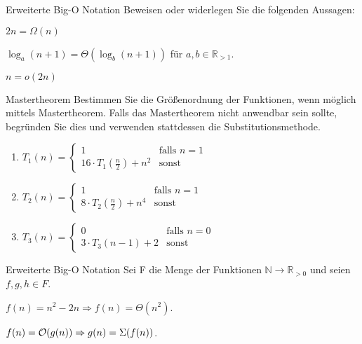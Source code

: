 \documentclass{exercisesheet}
\begin{document}
\begin{eexercises}{Erweiterte Big-O Notation}{
    Beweisen oder widerlegen Sie die folgenden Aussagen:
  }
  \item $2n = \Omega(n)$
  \item $\log_a(n+1) = \Theta(\log_b(n+1))$ für $a,b \in \mathbb{R}_{>1}$.
  \item $n = o(2n)$
\end{eexercises}

\begin{exercise}{Mastertheorem}
  Bestimmen Sie die Größenordnung der Funktionen, wenn möglich mittels Mastertheorem. Falls das Mastertheorem nicht anwendbar sein sollte, begründen Sie dies und verwenden stattdessen die Substitutionsmethode.
  \begin{enumerate}
    \item $T_1(n) = \begin{cases}
              1                               & \text{falls } n = 1 \\
              16 \cdot T_1(\frac{n}{2}) + n^2 & \text{sonst}
            \end{cases}$
    \item $T_2(n) = \begin{cases}
              1                              & \text{falls } n = 1 \\
              8 \cdot T_2(\frac{n}{2}) + n^4 & \text{sonst}
            \end{cases}$
    \item $T_3(n) = \begin{cases}
              0                    & \text{falls } n = 0 \\
              3 \cdot T_3(n-1) + 2 & \text{sonst}
            \end{cases}$
  \end{enumerate}
\end{exercise}

\begin{eexercises}{Erweiterte Big-O Notation}{
    Sei F die Menge der Funktionen $\mathbb{N} \rightarrow \mathbb{R}_{>0}$ und seien $f, g, h \in F$.
  }
  \item $f(n)=n^2-2n \Rightarrow f(n)=\Theta(n^2)$.
  \item $f(n)=\mathcal{O}(g(n)) \Rightarrow g(n)=\Sigma(f(n))$.
\end{eexercises}
\end{document}
